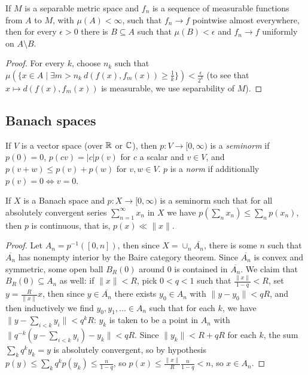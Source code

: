 \documentclass[letterpaper,11pt]{report}
\begin{document}

\begin{thm} If $M$ is a separable metric space and $f_n$ is a sequence of measurable functions from $A$ to $M$, with $\mu(A) < \infty$, such that $f_n \rightarrow f$ pointwise almost everywhere, then for every $\epsilon > 0$ there is $B \subseteq A$ such that $\mu(B) < \epsilon$ and $f_n \rightarrow f$ uniformly on $A\setminus B$.
\end{thm}
\begin{proof} For every $k$, choose $n_k$ such that $\mu(\{x \in A \mid \exists m > n_k\ d(f(x),f_m(x)) \ge \frac{1}{k}\}) < \frac{\epsilon}{2^k}$ (to see that $x \mapsto d(f(x),f_m(x))$ is measurable, we use separability of $M$).
\end{proof}


\subsection{Banach spaces}

\begin{defn} If $V$ is a vector space (over $\mathbb{R}$ or $\mathbb{C}$), then $p:V \rightarrow [0,\infty)$ is a \emph{seminorm} if $p(0) = 0$, $p(cv) = |c|p(v)$ for $c$ a scalar and $v\in V$, and $p(v+w) \le p(v) + p(w)$ for $v,w \in V$. $p$ is a \emph{norm} if additionally $p(v) = 0 \iff v = 0$.
\end{defn}

\begin{lem} If $X$ is a Banach space and $p : X \rightarrow [0,\infty)$ is a seminorm such that for all absolutely convergent series $\sum_{n=1}^\infty x_n$ in $X$ we have $p(\sum_n x_n) \le \sum_n p(x_n)$, then $p$ is continuous, that is, $p(x) \ll \|x\|$.
\end{lem}
\begin{proof} Let $A_n = p^{-1}([0,n])$, then since $X = \cup_n \overline{A_n}$, there is some $n$ such that $\overline{A_n}$ has nonempty interior by the Baire category theorem. Since $\overline{A_n}$ is convex and symmetric, some open ball $B_R(0)$ around $0$ is contained in $\overline{A_n}$. We claim that $B_R(0) \subseteq A_n$ as well: if $\|x\| < R$, pick $0 < q < 1$ such that $\frac{\|x\|}{1-q} < R$, set $y = \frac{R}{\|x\|}x$, then since $y \in \overline{A_n}$ there exists $y_0 \in A_n$ with $\|y - y_0\| < qR$, and then inductively we find $y_0, y_1, ... \in A_n$ such that for each $k$, we have $\|y - \sum_{i<k} y_i\| < q^kR$: $y_k$ is taken to be a point in $A_n$ with $\|q^{-k}(y - \sum_{i<k} y_i) - y_k\| < qR$. Since $\|y_k\| < R + qR$ for each $k$, the sum $\sum_k q^k y_k = y$ is absolutely convergent, so by hypothesis $p(y) \le \sum_k q^kp(y_k) \le \frac{n}{1-q}$, so $p(x) \le \frac{\|x\|}{R}\frac{n}{1-q} < n$, so $x \in A_n$.
\end{proof}
\end{document}
